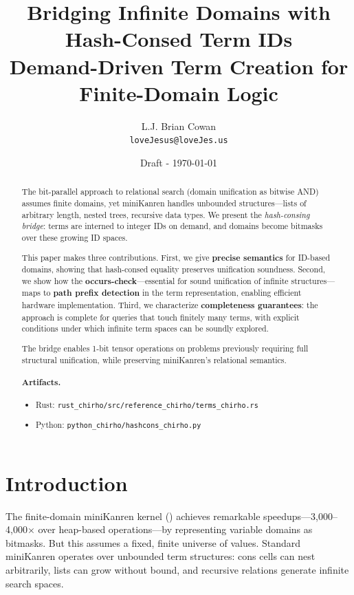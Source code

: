 \documentclass[11pt,a4paper]{article}
\title{Bridging Infinite Domains with Hash-Consed Term IDs\\
\large Demand-Driven Term Creation for Finite-Domain Logic}
\author{
  L.J. Brian Cowan \\
  \texttt{loveJesus@loveJes.us}
}
\date{Draft - \today}
\begin{document}
\maketitle

\begin{abstract}
The bit-parallel approach to relational search (domain unification as bitwise AND)
assumes finite domains, yet miniKanren handles unbounded structures---lists of
arbitrary length, nested trees, recursive data types.
We present the \emph{hash-consing bridge}: terms are interned to integer IDs on demand,
and domains become bitmasks over these growing ID spaces.

This paper makes three contributions.
First, we give \textbf{precise semantics} for ID-based domains, showing that
hash-consed equality preserves unification soundness.
Second, we show how the \textbf{occurs-check}---essential for sound unification
of infinite structures---maps to \textbf{path prefix detection} in the term
representation, enabling efficient hardware implementation.
Third, we characterize \textbf{completeness guarantees}: the approach is complete
for queries that touch finitely many terms, with explicit conditions under which
infinite term spaces can be soundly explored.

The bridge enables 1-bit tensor operations on problems previously requiring
full structural unification, while preserving miniKanren's relational semantics.

\paragraph{Artifacts.}
\begin{itemize}
  \item Rust: \texttt{rust\_chirho/src/reference\_chirho/terms\_chirho.rs}
  \item Python: \texttt{python\_chirho/hashcons\_chirho.py}
\end{itemize}
\end{abstract}

\section{Introduction}
\label{sec:intro_chirho}

\scopeclarification

The finite-domain miniKanren kernel (\fdmk) achieves remarkable speedups---3,000--4,000$\times$
over heap-based operations---by representing variable domains as bitmasks.
But this assumes a fixed, finite universe of values.
Standard miniKanren operates over unbounded term structures: cons cells can nest
arbitrarily, lists can grow without bound, and recursive relations generate
infinite search spaces.
\end{document}
